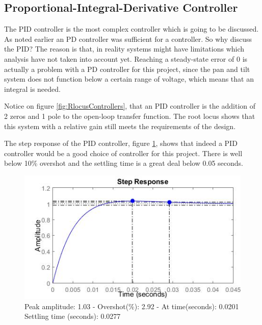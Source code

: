 \subsection{Proportional-Integral-Derivative Controller}

The PID controller is the most complex controller which is going to be discussed. As noted earlier an PD controller was sufficient for a controller. So why discuss the PID? The reason is that, in reality systems might have limitations which analysis have not taken into account yet. Reaching a steady-state error of 0 is actually a problem with a PD controller for this project, since the pan and tilt system does not function below a certain range of voltage, which means that an integral is needed.\par

Notice on figure \ref{fig:RlocusControllers}, that an PID controller is the addition of 2 zeros and 1 pole to the open-loop transfer function. The root locus shows that this system with a relative gain still meets the requirements of the design.\par

The step response of the PID controller, figure \ref{fig:PIDStep}, shows that indeed a PID controller would be a good choice of controller for this project. There is well below 10\% overshot and the settling time is a great deal below 0.05 seconds.

\begin{figure}[h!]
\centering
\includegraphics[scale=0.7]{Billeder/PIDStep.jpg}
\caption{ Peak amplitude: 1.03 - Overshot(\%): 2.92 - At time(seconds): 0.0201
		 Settling time (seconds): 0.0277 }
\label{fig:PIDStep}
\end{figure}

